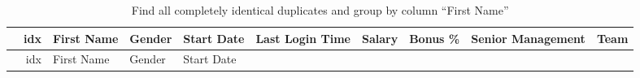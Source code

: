 \documentclass [oneside,10pt,a4paper,ngerman,BCOR10mm,headsepline,parindent,final]{scrartcl}
\begin{document}
    \begin{longtable}[]{@{}rrllllrrll@{}}
\caption{Find all completely identical duplicates and group by column
``First Name''}\tabularnewline
\toprule
\begin{minipage}[b]{0.03\columnwidth}\raggedleft
\strut
\end{minipage} & \begin{minipage}[b]{0.04\columnwidth}\raggedleft
idx\strut
\end{minipage} & \begin{minipage}[b]{0.08\columnwidth}\raggedright
First Name\strut
\end{minipage} & \begin{minipage}[b]{0.06\columnwidth}\raggedright
Gender\strut
\end{minipage} & \begin{minipage}[b]{0.08\columnwidth}\raggedright
Start Date\strut
\end{minipage} & \begin{minipage}[b]{0.10\columnwidth}\raggedright
Last Login Time\strut
\end{minipage} & \begin{minipage}[b]{0.06\columnwidth}\raggedleft
Salary\strut
\end{minipage} & \begin{minipage}[b]{0.06\columnwidth}\raggedleft
Bonus \%\strut
\end{minipage} & \begin{minipage}[b]{0.12\columnwidth}\raggedright
Senior Management\strut
\end{minipage} & \begin{minipage}[b]{0.12\columnwidth}\raggedright
Team\strut
\end{minipage}\tabularnewline
\midrule
\endfirsthead
\toprule
\begin{minipage}[b]{0.03\columnwidth}\raggedleft
\strut
\end{minipage} & \begin{minipage}[b]{0.04\columnwidth}\raggedleft
idx\strut
\end{minipage} & \begin{minipage}[b]{0.08\columnwidth}\raggedright
First Name\strut
\end{minipage} & \begin{minipage}[b]{0.06\columnwidth}\raggedright
Gender\strut
\end{minipage} & \begin{minipage}[b]{0.08\columnwidth}\raggedright
Start Date\strut
\end{minipage} & \begin{minipage}[b]{0.10\columnwidth}\raggedright

\end{minipage}
\end{longtable}
\end{document}
